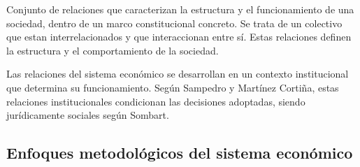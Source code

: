 \documentclass[12pt]{book} %
\begin{document}
Conjunto de relaciones que caracterizan la estructura y el
funcionamiento de una sociedad, dentro de un marco constitucional
concreto. Se trata de un colectivo que estan interrelacionados y que
interaccionan entre sí. Estas relaciones definen la estructura y el
comportamiento de la sociedad.

Las relaciones del sistema económico se desarrollan en un contexto
institucional que determina su funcionamiento. Según Sampedro y Martínez
Cortiña, estas relaciones institucionales condicionan las decisiones
adoptadas, siendo jurídicamente sociales según Sombart.

\hypertarget{enfoques-metodoluxf3gicos-del-sistema-econuxf3mico}{%
\subsection{Enfoques metodológicos del sistema
económico}\label{enfoques-metodoluxf3gicos-del-sistema-econuxf3mico}}
\end{document}

